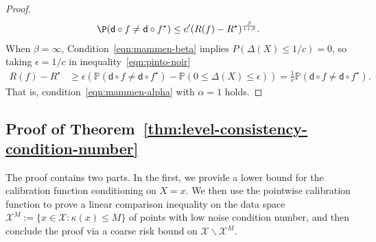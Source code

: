 \documentclass[11pt]{article}
\newcommand{\prn}[1]{\left({#1}\right)} %
\newcommand{\pred}{\mathsf{d}}  %
\newcommand{\sX}{\mathcal{X}} %
\begin{document}
\begin{proof}
\begin{align*}
    \P(\pred \circ f \neq \pred \circ f^\star)
    \leq c' (R(f) - R^\star)^{\frac{\beta}{1+\beta}}.
  \end{align*}
  When $\beta = \infty$,
  Condition~\eqref{eqn:mammen-beta}
  implies $P(\Delta(X) \leq 1/c) = 0$,
  so taking $\epsilon =1/c$ in inequality~\eqref{eqn:pinto-noir}
  \begin{align*}
    R(f) - R^\star &\geq \epsilon \prn{\mathbb{P}(\pred \circ f \neq \pred \circ f^\star) - \mathbb{P}(0 \leq \Delta(X) \leq \epsilon)} = \frac 1 c \mathbb{P}(\pred \circ f \neq \pred \circ f^\star).
  \end{align*}
  That is, condition~\eqref{eqn:mammen-alpha} with $\alpha = 1$ holds.
\end{proof}

\subsection{Proof of Theorem~\ref{thm:level-consistency-condition-number}}
\label{proof:level-consistency-condition-number}

The proof contains two parts.
%
In the first, we provide a lower bound for the calibration function
conditioning on $X=x$.
%
We then use the pointwise calibration function to prove a linear comparison
inequality on the data space $\sX^M := \{x \in \sX : \kappa(x) \leq M\}$ of
points with low noise condition number, and then conclude the proof via a
coarse risk bound on $\sX \backslash \sX^M$.
\end{document}
